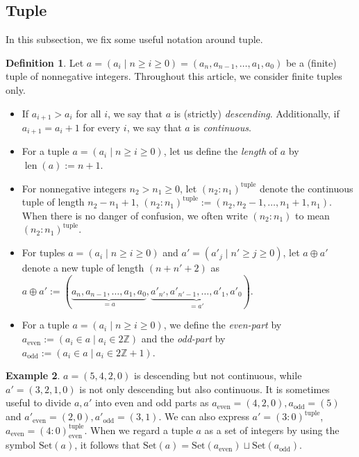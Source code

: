 \documentclass[12pt]{amsart}
\theoremstyle{definition}
\newtheorem{definition}{Definition}[section]
\newtheorem{example}[definition]{Example}
\newcommand{\ZZ}{\mathbb{Z}}
\newcommand{\tuple}[1]{({#1}:0)^{\text{tuple}}}
\newcommand{\tuplee}[2]{({#1}:{#2})^{\text{tuple}}}
\newcommand{\even}[1]{{#1}_\text{even}}
\newcommand{\odd}[1]{{#1}_\text{odd}}
\newcommand{\length}[1]{\operatorname{len}(#1)}
\begin{document}
\subsection{Tuple}\label{subsection:tuple}
In this subsection, we fix some useful notation around tuple. 
\begin{definition}\label{definition:tuple}
Let $a=(a_i \mid n \geq i \geq 0)=(a_n,a_{n-1},\ldots,a_1,a_0)$ 
be a (finite) tuple of nonnegative integers. 
Throughout this article, we consider finite tuples only. 
\begin{itemize}
\item If $a_{i+1} > a_i$ for all $i$, we say that $a$ is (strictly) \emph{descending}. 
Additionally, 
if $a_{i+1}=a_i+1$ for every $i$, we say that $a$ is \emph{continuous}.
%
\item For a tuple $a=(a_i \mid n \geq i \geq 0)$, 
let us define the \emph{length} of $a$ by $\length{a}:=n+1$. 
%
\item For nonnegative integers $n_2>n_1\geq0$, 
let $\tuplee{n_2}{n_1}$ denote the continuous tuple of length $n_2-n_1+1$, 
$\tuplee{n_2}{n_1}:=(n_2,n_2-1,\ldots,n_1+1,n_1)$. 
When there is no %
danger of confusion, 
we often write $(n_2:n_1)$ to mean $\tuplee{n_2}{n_1}$.
%
\item For tuples $a=(a_i \mid n \geq i \geq 0)$ and $a'=(a'_j \mid n' \geq j \geq 0)$, 
let $a \oplus a'$ denote a new tuple of length $(n+n'+2)$ as 
$a \oplus a':=(\underbrace{a_{n}, a_{n-1}, \ldots, a_{1}, a_{0}}_{=a}, 
\underbrace{a'_{n'}, a'_{n'-1}, \ldots, a'_{1}, a'_{0}}_{=a'})$. \vspace{-3mm}
%
\item For a tuple $a=(a_i \mid n \geq i \geq 0)$, we define the \emph{even-part} by $\even{a}:=(a_i\in a \mid a_i\in2\ZZ)$ and the \emph{odd-part} by 
$\odd{a}:=(a_i\in a \mid a_i\in2\ZZ+1)$.
\end{itemize}
\end{definition}
%
\begin{example} 
$a=(5,4,2,0)$ is descending but not continuous, while 
$a'=(3,2,1,0)$ is not only descending but also continuous. 
It is sometimes useful to divide $a,a'$ into even and odd parts as $\even{a}=(4,2,0),\odd{a}=(5)$ and $\even{a'}=(2,0),\odd{a'}=(3,1)$. We can also express $a'=\tuple{3}$, $\even{a}=\tuple{4}_{\text{even}}$.
When we regard a tuple $a$ as a set of integers by using the symbol $\text{Set}(a)$, 
it follows that 
$\text{Set}(a)=\text{Set}(\even{a})\sqcup\text{Set}(\odd{a})$. 
\end{example}
%
\end{document}
